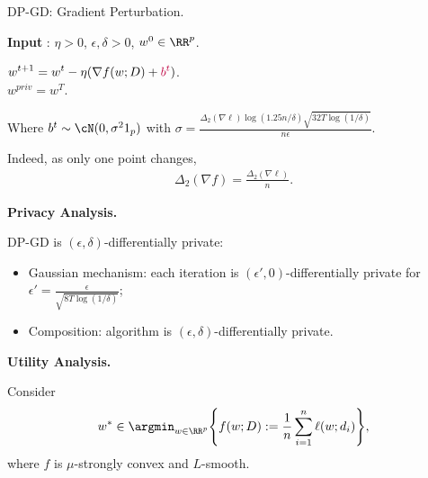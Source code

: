 \documentclass[notheorems]{beamer}
\begin{document}
\begin{frame}
  \begin{algorithm}[H]
    \caption{DP-GD: Gradient Perturbation.}
    \label{algo:bassily-erm}
    \textbf{Input} : $\eta > 0$, $\epsilon, \delta > 0$, $w^0 \in \RR^p$.
    \begin{algorithmic}[1]
      \State $\displaystyle w^{t+1} = w^t - \eta (\nabla f(w; D) + {\color{purple}b^t})$.
      \EndFor \\
      \Return $w^{priv} = w^T$.
    \end{algorithmic}
  \end{algorithm}

  Where $b^t \sim \cN(0, \sigma^2 1_p)$ with $\sigma = \frac{\Delta_2(\nabla \ell) \log(1.25n/\delta) \sqrt{32T\log(1/\delta)}}{n\epsilon}$.

  Indeed, as only one point changes,
  \begin{align*}
    \Delta_2(\nabla f) = \frac {\Delta_2(\nabla \ell)}{n}.
  \end{align*}
\end{frame}

\begin{frame}
  \textbf{Privacy Analysis.}

  DP-GD is $(\epsilon, \delta)$-differentially private:
  \begin{itemize}
  \item Gaussian mechanism: each iteration is $(\epsilon', 0)$-differentially private for $\epsilon' = \frac{\epsilon}{\sqrt{8T\log(1/\delta)}}$;
  \item Composition: algorithm is $(\epsilon, \delta)$-differentially private.
  \end{itemize}
\end{frame}


\begin{frame}
  \textbf{Utility Analysis.}

  Consider
  \begin{align}
    w^* \in \argmin_{w \in \RR^p} \Bigg\{ f(w; D) := \frac 1n \sum_{i=1}^n \ell(w; d_i) \Bigg\},
  \end{align}
  where $f$ is $\mu$-strongly convex and $L$-smooth.

\end{frame}
\end{document}
